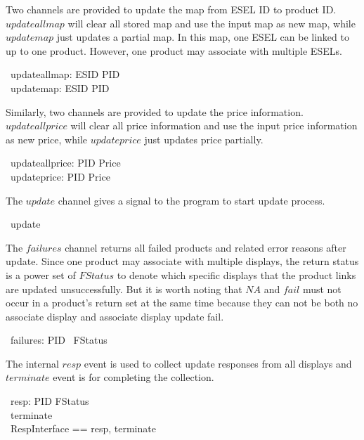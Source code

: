 Two channels are provided to update the map from ESEL ID to product ID. $updateallmap$ will clear all stored map and use the input map as new map, while $updatemap$ just updates a partial map. In this map, one ESEL can be linked to up to one product. However, one product may associate with multiple ESELs.
\begin{circus}
	\circchannel\ updateallmap: ESID \pfun PID \\
	\circchannel\ updatemap: ESID \pfun PID
\end{circus}

Similarly, two channels are provided to update the price information. $updateallprice$ will clear all price information and use the input price information as new price, while $updateprice$ just updates price partially.
\begin{circus}
	\circchannel\ updateallprice: PID \pfun Price \\
	\circchannel\ updateprice: PID \pfun Price
\end{circus}

The $update$ channel gives a signal to the program to start update process.
\begin{circus}
	\circchannel\ update
\end{circus}

The $failures$ channel returns all failed products and related error reasons after update. Since one product may associate with multiple displays, the return status is a power set of $FStatus$ to denote which specific displays that the product links are updated unsuccessfully. But it is worth noting that $NA$ and $fail$ must not occur in a product's return set at the same time because they can not be both no associate display and associate display update fail.
\begin{circus}
	\circchannel\ failures: PID \pfun \power~FStatus
\end{circus}

The internal $resp$ event is used to collect update responses from all displays and $terminate$ event is for completing the collection.
\begin{circus}
	\circchannel\ resp: PID \cross FStatus \\
    \circchannel\ terminate \\
    \circchannelset\ RespInterface == \lchanset resp, terminate \rchanset
\end{circus}

